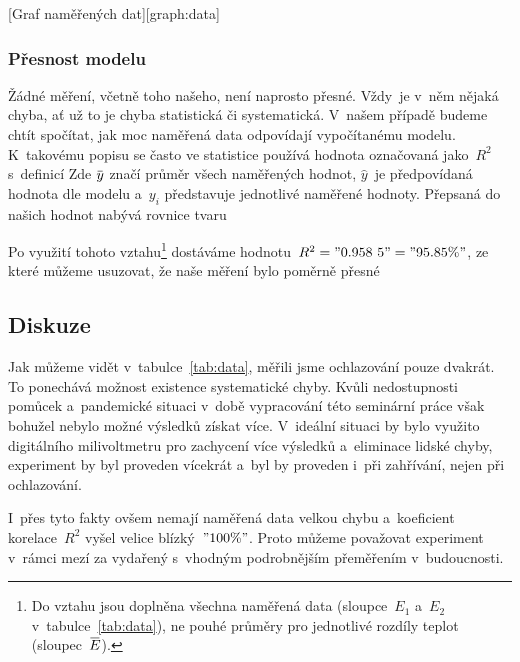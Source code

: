 [Graf naměřených dat][graph:data]


\subsubsection{Přesnost modelu}
\label{sec:presnost}
Žádné měření, včetně toho našeho, není naprosto přesné. Vždy~je v~něm nějaká chyba,
ať už to je chyba statistická či systematická. V~našem případě budeme chtít 
spočítat, jak moc naměřená data odpovídají vypočítanému modelu. K~takovému
popisu se často ve statistice používá hodnota označovaná jako~$R^2$ s~definicí
Zde $\avg y$ značí průměr všech naměřených hodnot, $\hat y$~je předpovídaná
hodnota dle modelu a~$y_i$ představuje jednotlivé naměřené hodnoty. Přepsaná do
našich hodnot nabývá rovnice tvaru

Po využití tohoto vztahu\footnote{Do vztahu jsou doplněna všechna naměřená data
(sloupce~$E_1$ a~$E_2$ v~tabulce~\ref{tab:data}), ne pouhé průměry pro
jednotlivé rozdíly teplot (sloupec~$\avg{E}$).} dostáváme 
hodnotu~$R^2 = "0.958~5" = "95.85 \%"$, ze které můžeme usuzovat, že naše 
měření bylo poměrně přesné

\subsection{Diskuze}
Jak můžeme vidět v~tabulce~\ref{tab:data}, měřili jsme ochlazování pouze
dvakrát. To ponechává možnost existence systematické chyby. Kvůli nedostupnosti
pomůcek a~pandemické situaci v~době vypracování této seminární práce však
bohužel nebylo možné výsledků získat více. V~ideální situaci by bylo využito
digitálního milivoltmetru pro zachycení více výsledků a~eliminace lidské chyby,
experiment by byl proveden vícekrát a~byl by proveden i~při zahřívání, nejen
při ochlazování.

I~přes tyto fakty ovšem nemají naměřená data velkou chybu a~koeficient
korelace~$R^2$ vyšel velice blízký~$"100 \%"$. Proto můžeme považovat
experiment v~rámci mezí za vydařený s~vhodným podrobnějším přeměřením
v~budoucnosti.
